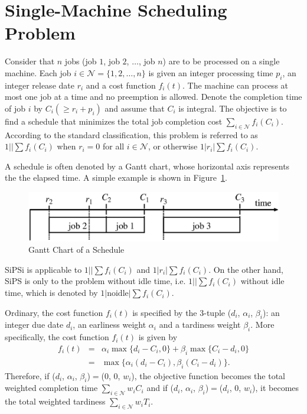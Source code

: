 \documentclass[a4paper]{book}
\begin{document}
\section{Single-Machine Scheduling Problem}

Consider that $n$ jobs (job $1$, job $2$, $\ldots$, job $n$) are to be processed on a single machine.
Each job $i\in\mathcal{N}=\{1,2,\ldots,n\}$ is given an integer processing time $p_i$, an integer release date $r_i$ and a cost function $f_i(t)$.
The machine can process at most one job at a time and no preemption is allowed.
Denote the completion time of job $i$ by $C_i(\ge r_i+p_i)$ and assume that $C_i$ is integral.
The objective is to find a schedule that minimizes the total job completion cost $\sum_{i\in\mathcal{N}}f_i(C_i)$.
According to the standard classification, this problem is referred to as $1||\sum f_i(C_i)$ when $r_i=0$ for all $i\in\mathcal{N}$, or otherwise $1|r_i|\sum f_i(C_i)$.

A schedule is often denoted by a Gantt chart, whose horizontal axis represents the the elapsed time. A simple example is shown in Figure~\ref{fig:Gantt}.

\begin{figure}[tp]
  \centering
  \includegraphics[scale=0.8]{gantt.eps}
  \caption{Gantt Chart of a Schedule}
  \label{fig:Gantt}
\end{figure}


SiPSi is applicable to $1||\sum f_i(C_i)$ and $1|r_i|\sum f_i(C_i)$.
On the other hand, SiPS is only to the problem without idle time, i.e. $1||\sum f_i(C_i)$ without idle time, which is denoted by $1|\mathrm{noidle}|\sum f_i(C_i)$.

Ordinary, the cost function $f_i(t)$ is specified by the 3-tuple ($d_i$, $\alpha_i$, $\beta_i$): an integer due date $d_i$, an earliness weight $\alpha_i$ and
a tardiness weight $\beta_i$.
More specifically, the cost function $f_i(t)$ is given by
\begin{eqnarray}
  f_i(t)
    &=&\alpha_i\max\{d_i-C_i,0\}+\beta_i\max\{C_i-d_i,0\}
    \nonumber\\
    &=&\max\{\alpha_i(d_i-C_i),\beta_i(C_i-d_i)\}.
\end{eqnarray}
Therefore, if ($d_i$, $\alpha_i$, $\beta_i$)$=$($0$, $0$, $w_i$), the objective function becomes the total weighted completion time $\sum_{i\in\mathcal{N}}w_iC_i$ and if ($d_i$, $\alpha_i$, $\beta_i$)$=$($d_i$, $0$, $w_i$), it becomes the total weighted tardiness $\sum_{i\in\mathcal{N}}w_iT_i$.
\end{document}
